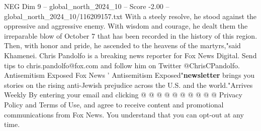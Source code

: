 \begin{textsample}{NEG Dim 9 – global\_north\_2024\_10 – Score -2.00 – global\_north\_2024\_10/116209157.txt}
With a steely resolve, he stood against the oppressive and aggressive enemy.
With wisdom and courage, he dealt them the irreparable blow of October 7 that has been recorded in the history of this region.
Then, with honor and pride, he ascended to the heavens of the martyrs,"said Khamenei.
Chris Pandolfo is a breaking news reporter for Fox News Digital.
Send tips to chris.pandolfo@fox.com and follow him on Twitter @ChrisCPandolfo.
Antisemitism Exposed Fox News ' Antisemitism Exposed"\textbf{newsletter} brings you stories on the rising anti-Jewish prejudice across the U.S. and the world."Arrives Weekly By entering your email and clicking @ @ @ @ @ @ @ @ @ @ Privacy Policy and Terms of Use, and agree to receive content and promotional communications from Fox News.
You understand that you can opt-out at any time.

\end{textsample}
